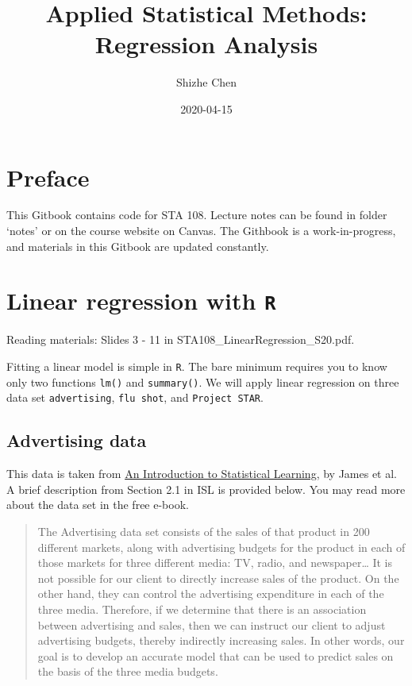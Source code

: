 \documentclass[12pt,]{book}
\title{Applied Statistical Methods: Regression Analysis}
\author{Shizhe Chen}
\date{2020-04-15}
\begin{document}
\maketitle

{
\setcounter{tocdepth}{1}
\tableofcontents
}
\chapter*{Preface}\label{pre}

This Gitbook contains code for STA 108. Lecture notes can be found in
folder `notes' or on the course website on Canvas. The Githbook is a
work-in-progress, and materials in this Gitbook are updated constantly.

\chapter{\texorpdfstring{Linear regression with
\texttt{R}}{Linear regression with R}}\label{ch:lmR}

Reading materials: Slides 3 - 11 in STA108\_LinearRegression\_S20.pdf.

Fitting a linear model is simple in \texttt{R}. The bare minimum
requires you to know only two functions \texttt{lm()} and
\texttt{summary()}. We will apply linear regression on three data set
\texttt{advertising}, \texttt{flu\ shot}, and \texttt{Project\ STAR}.

\section{Advertising data}\label{advertising-data}

This data is taken from
\href{http://faculty.marshall.usc.edu/gareth-james/ISL/}{An Introduction
to Statistical Learning}, by James et al. A brief description from
Section 2.1 in ISL is provided below. You may read more about the data
set in the free e-book.

\begin{quote}
The Advertising data set consists of the sales of that product in 200
different markets, along with advertising budgets for the product in
each of those markets for three different media: TV, radio, and
newspaper\ldots{} It is not possible for our client to directly increase
sales of the product. On the other hand, they can control the
advertising expenditure in each of the three media. Therefore, if we
determine that there is an association between advertising and sales,
then we can instruct our client to adjust advertising budgets, thereby
indirectly increasing sales. In other words, our goal is to develop an
accurate model that can be used to predict sales on the basis of the
three media budgets.
\end{quote}
\end{document}
